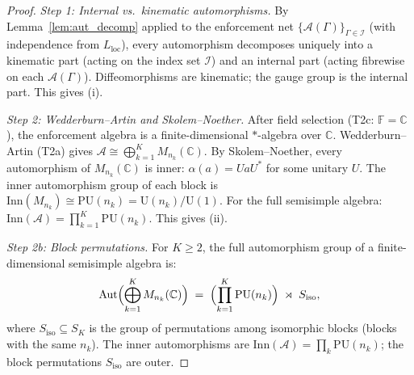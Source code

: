 \documentclass[11pt,a4paper]{article}
\theoremstyle{definition}
\begin{document}
\begin{proof}

\textit{Step 1: Internal vs.\ kinematic automorphisms.}\quad
By Lemma~\ref{lem:aut_decomp} applied to the enforcement net
$\{\mathcal{A}(\Gamma)\}_{\Gamma \in \mathcal{I}}$ (with independence
from $L_{\mathrm{loc}}$), every automorphism decomposes uniquely into a
kinematic part (acting on the index set $\mathcal{I}$) and an internal
part (acting fibrewise on each $\mathcal{A}(\Gamma)$).
Diffeomorphisms are kinematic; the gauge group is the internal part.
This gives (i).

\textit{Step 2: Wedderburn--Artin and Skolem--Noether.}\quad
After field selection (T2c: $\mathbb{F} = \mathbb{C}$), the enforcement
algebra is a finite-dimensional $*$-algebra over $\mathbb{C}$.
Wedderburn--Artin (T2a) gives
$\mathcal{A} \cong \bigoplus_{k=1}^{K} M_{n_k}(\mathbb{C})$.
By Skolem--Noether, every automorphism of $M_{n_k}(\mathbb{C})$ is inner:
$\alpha(a) = UaU^*$ for some unitary $U$.  The inner automorphism group
of each block is $\mathrm{Inn}(M_{n_k}) \cong \mathrm{PU}(n_k) =
\mathrm{U}(n_k) / \mathrm{U}(1)$.  For the full semisimple algebra:
$\mathrm{Inn}(\mathcal{A}) = \prod_{k=1}^K \mathrm{PU}(n_k)$.
This gives (ii).

\textit{Step 2b: Block permutations.}\quad
For $K \ge 2$, the full automorphism group of a finite-dimensional
semisimple algebra is:
\[
  \mathrm{Aut}\Bigl(\bigoplus_{k=1}^K M_{n_k}(\mathbb{C})\Bigr)
  \;=\;
  \Bigl(\prod_{k=1}^K \mathrm{PU}(n_k)\Bigr) \;\rtimes\; S_{\mathrm{iso}},
\]
where $S_{\mathrm{iso}} \subseteq S_K$ is the group of permutations among
isomorphic blocks (blocks with the same $n_k$).  The inner automorphisms
are $\mathrm{Inn}(\mathcal{A}) = \prod_k \mathrm{PU}(n_k)$; the block
permutations $S_{\mathrm{iso}}$ are outer.


\end{proof}
\end{document}
